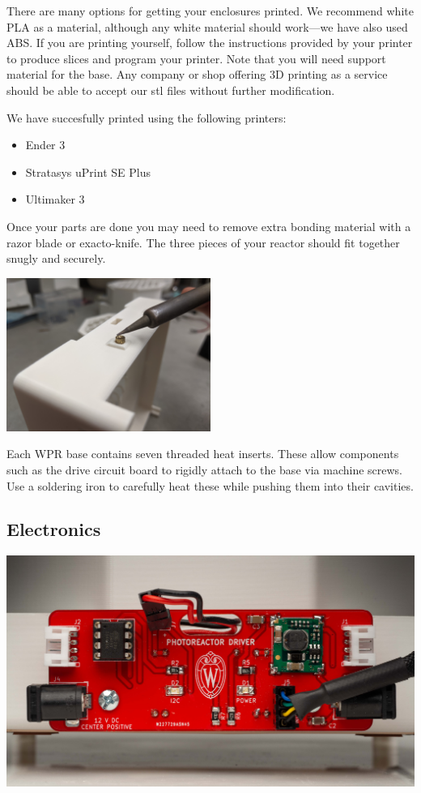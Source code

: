 \documentclass[11pt]{article}
\begin{document}
There are many options for getting your enclosures printed.
We recommend white PLA as a material, although any white material should work---we have also used ABS.
If you are printing yourself, follow the instructions provided by your printer to produce slices and program your printer.
Note that you will need support material for the base.
Any company or shop offering 3D printing as a service should be able to accept our stl files without further modification.

We have succesfully printed using the following printers:

\begin{itemize}
  \item Ender 3
  \item Stratasys uPrint SE Plus
  \item Ultimaker 3
\end{itemize}

Once your parts are done you may need to remove extra bonding material with a razor blade or exacto-knife.
The three pieces of your reactor should fit together snugly and securely.

\clearpage

\begin{center}
  \includegraphics[width=0.5\textwidth]{"./heat-insert.jpg"}
\end{center}

Each WPR base contains seven threaded heat inserts.
These allow components such as the drive circuit board to rigidly attach to the base via machine screws.
Use a soldering iron to carefully heat these while pushing them into their cavities.

\subsection{Electronics} \label{SEC:electronics}

\includegraphics[width=\textwidth]{"./electronics-coverart.jpg"}
\end{document}
